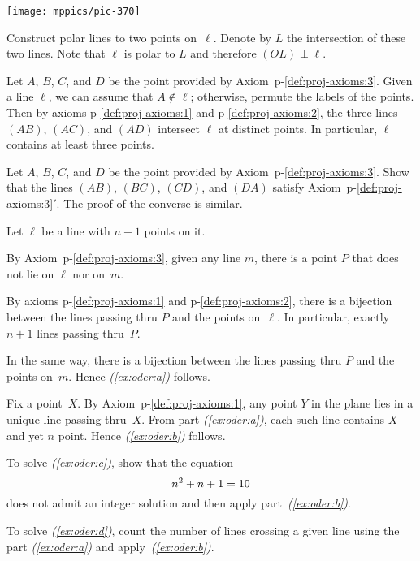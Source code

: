 \begin{multicols}{2}
\begin{Figure}
\vskip-0mm
\centering
\texttt{[image: mppics/pic-370]}
\vskip-6mm
\end{Figure} 

Construct polar lines to two points on~$\ell$.
Denote by $L$ the intersection of these two lines.
Note that $\ell$ is polar to $L$ and therefore $(OL)\perp \ell$.

Let $A$, $B$, $C$, and $D$ 
be the point provided by Axiom~p-\ref{def:proj-axioms:3}.
Given a line $\ell$, we can assume that $A\notin \ell$; 
otherwise, permute the labels of the points.
Then by axioms p-\ref{def:proj-axioms:1} and p-\ref{def:proj-axioms:2},
the three lines $(AB)$, $(AC)$, and $(AD)$ intersect $\ell$ at distinct points.
In particular, $\ell$ contains at least three points. 

Let $A$, $B$, $C$, and $D$ 
be the point provided by Axiom~p-\ref{def:proj-axioms:3}.
Show that the lines $(AB)$, $(BC)$, $(CD)$, and $(DA)$
satisfy Axiom~p-\ref{def:proj-axioms:3}$'$.
The proof of the converse is similar.

Let $\ell$ be a line with $n+1$ points on it.

By Axiom~p-\ref{def:proj-axioms:3}, given any line $m$, there is a point $P$ that does not lie on $\ell$ nor on~$m$.

By axioms p-\ref{def:proj-axioms:1} and p-\ref{def:proj-axioms:2}, there is a bijection between the lines passing thru $P$ and the points on~$\ell$.
In particular, exactly $n+1$ lines passing thru~$P$.

In the same way, there is a bijection between the lines passing thru $P$ and the points on~$m$. 
Hence \textit{(\ref{ex:oder:a})} follows.

Fix a point~$X$.
By Axiom~p-\ref{def:proj-axioms:1}, any point $Y$ in the plane lies in a unique line passing thru~$X$.
From part \textit{(\ref{ex:oder:a})}, each such line contains $X$ and yet $n$ point.
Hence \textit{(\ref{ex:oder:b})} follows.

To solve \textit{(\ref{ex:oder:c})}, show that the equation
\[n^2+n+1\z=10\] 
does not admit an integer solution and then apply part~\textit{(\ref{ex:oder:b})}.


To solve \textit{(\ref{ex:oder:d})}, count the number of lines crossing a given line using the 
part \textit{(\ref{ex:oder:a})} and apply~\textit{(\ref{ex:oder:b})}.

\setcounter{eqtn}{0}




\end{multicols}
